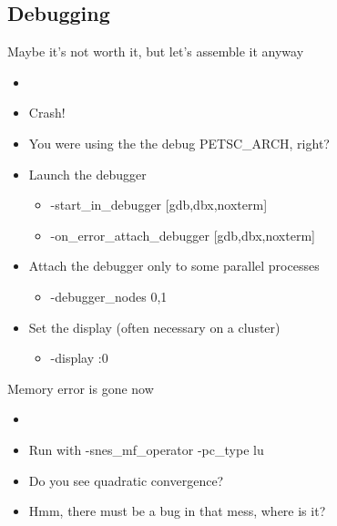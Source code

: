 \subsection{Debugging}
\begin{frame}{Maybe it's not worth it, but let's assemble it anyway}
  \begin{itemize}
  \item {}
  \item Crash!
  \item You were using the the debug PETSC\_ARCH, right?
  \item Launch the debugger
  \begin{itemize}
    \item {\kb -start\_in\_debugger  [gdb,dbx,noxterm]}
    \item {\kb -on\_error\_attach\_debugger [gdb,dbx,noxterm]}
  \end{itemize}

  \item Attach the debugger only to some parallel processes
  \begin{itemize}
    \item {\kb -debugger\_nodes 0,1}
  \end{itemize}

  \item Set the display (often necessary on a cluster)
  \begin{itemize}
    \item {\kb -display :0}
  \end{itemize}
\end{itemize}
\end{frame}  



\begin{frame}{Memory error is gone now}
\begin{itemize}
  \item {}
  \item Run with {-snes\_mf\_operator -pc\_type lu}
  \item Do you see quadratic convergence?
  \item<2-> Hmm, there must be a bug in that mess, where is it?
  \end{itemize}
\end{frame}

